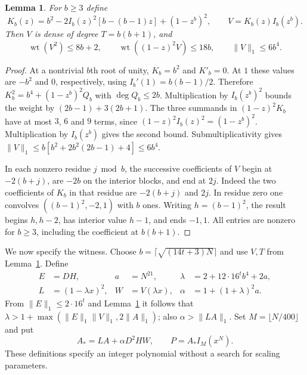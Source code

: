 \documentclass[10pt,a4paper,reqno]{amsart}
\newtheorem{lemma}[theorem]{Lemma}
\newcommand{\wt}{\operatorname{wt}}
\begin{document}
\begin{lemma}\label{filler}
For $b\ge3$ define
\[
 K_b(z)=b^2-2I_b(z)^2[b-(b-1)z]+(1-z^b)^2,\qquad V=K_b(z)I_b(z^b).
\]
Then $V$ is dense of degree $T=b(b+1)$, and
\[
 \wt(V^2)\le8b+2,\qquad \wt((1-z)^2V)\le18b,\qquad \|V\|_1\le6b^4.
\]
\end{lemma}
\begin{proof}
At a nontrivial $b$th root of unity, $K_b=b^2$ and $K'_b=0$. At $1$ these values are $-b^2$ and $0$, respectively, using $I_b'(1)=b(b-1)/2$. Therefore $K_b^2=b^4+(1-z^b)^2Q_b$ with $\deg Q_b\le2b$. Multiplication by $I_b(z^b)^2$ bounds the weight by $(2b-1)+3(2b+1)$. The three summands in $(1-z)^2K_b$ have at most $3$, $6$ and $9$ terms, since $(1-z)^2I_b(z)^2=(1-z^b)^2$. Multiplication by $I_b(z^b)$ gives the second bound. Submultiplicativity gives $\|V\|_1\le b[b^2+2b^2(2b-1)+4]\le6b^4$.

In each nonzero residue $j\bmod b$, the successive coefficients of $V$ begin at $-2(b+j)$, are $-2b$ on the interior blocks, and end at $2j$. Indeed the two coefficients of $K_b$ in that residue are $-2(b+j)$ and $2j$. In residue zero one convolves $((b-1)^2,-2,1)$ with $b$ ones. Writing $h=(b-1)^2$, the result begins $h,h-2$, has interior value $h-1$, and ends $-1,1$. All entries are nonzero for $b\ge3$, including the coefficient at $b(b+1)$.
\end{proof}

We now specify the witness. Choose $b=\lceil\sqrt{(14t+3)N}\rceil$ and use $V,T$ from Lemma~\ref{filler}. Define
\begin{align*}
 E&=DH, & a&=N^{21}, & \lambda&=2+12\cdot16^t b^4+2a,\\
 L&=(1-\lambda x)^2, & W&=V(\lambda x), & \alpha&=1+(1+\lambda)^2a.
\end{align*}
From $\|E\|_1\le2\cdot16^t$ and Lemma~\ref{filler} it follows that $\lambda>1+\max(\|E\|_1\|V\|_1,2\|A\|_1)$; also $\alpha>\|LA\|_1$. Set $M=\lfloor N/400\rfloor$ and put
\begin{equation}\label{witness}
             A_*=LA+\alpha D^2HW,\qquad P=A_* I_M(x^N).
\end{equation}
These definitions specify an integer polynomial without a search for scaling parameters.
\end{document}
